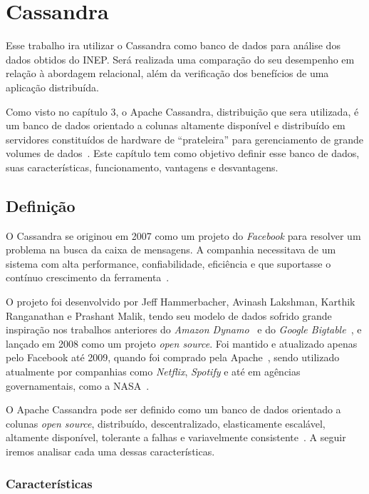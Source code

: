 \chapter{Cassandra} \label{chap:cassandra}

Esse trabalho ira utilizar o Cassandra como banco de dados para análise dos dados obtidos do INEP. Será realizada uma comparação do seu desempenho em relação à abordagem relacional, além da verificação dos benefícios de uma aplicação distribuída.

Como visto no capítulo 3, o Apache Cassandra, distribuição que sera utilizada, é um banco de dados orientado a colunas altamente disponível e distribuído em servidores constituídos de hardware de \enquote{prateleira} para gerenciamento de grande volumes de dados~\cite{lakshmancassandra}. Este capítulo tem como objetivo definir esse banco de dados, suas características, funcionamento, vantagens e desvantagens.

\section{Definição}
O Cassandra se originou em 2007 como um projeto do \emph{Facebook} para resolver um problema na busca da caixa de mensagens. A companhia necessitava de um sistema com alta performance, confiabilidade, eficiência e que suportasse o contínuo crescimento da ferramenta~\cite{lakshmancassandra, cassandraguide}. 

O projeto foi desenvolvido por Jeff Hammerbacher, Avinash Lakshman, Karthik Ranganathan e Prashant Malik, tendo seu modelo de dados sofrido grande inspiração nos trabalhos anteriores do \emph{Amazon Dynamo}~\cite{dynamo} e do \emph{Google Bigtable}~\cite{bigtable}, e lançado em 2008 como um projeto \emph{open source}. Foi mantido e atualizado apenas pelo Facebook até 2009, quando foi comprado pela Apache~\cite{cassandraguide}, sendo utilizado atualmente por companhias como \emph{Netflix}, \emph{Spotify} e até em agências governamentais, como a NASA~\cite{cassandracompanies}. 

O Apache Cassandra pode ser definido como um banco de dados orientado a colunas \emph{open source}, distribuído, descentralizado, elasticamente escalável, altamente disponível, tolerante a falhas e variavelmente consistente~\cite{cassandraguide}. A seguir iremos analisar cada uma dessas características.

\subsection{Características}

